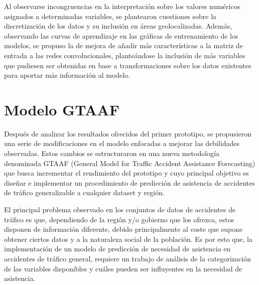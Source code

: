 
Al observarse incongruencias en la interpretación sobre los valores numéricos asignados a determinadas variables, se plantearon cuestiones sobre la discretización de los datos y su inclusión en áreas geolocalizadas. Además, observando las curvas de aprendizaje en las gráficas de entrenamiento de los modelos, se propuso la de mejora de añadir más características a la matriz de entrada a las redes convolucionales, planteándose la inclusión de más variables que pudiesen ser obtenidas en base a transformaciones sobre los datos existentes para aportar más información al modelo.

\section{Modelo GTAAF}
\label{METODOLOGIA_GTAAF}


Después de analizar los resultados ofrecidos del primer prototipo, se propusieron una serie de modificaciones en el modelo enfocadas a mejorar las debilidades observadas. Estos cambios se estructuraron en una nueva metodología denominada GTAAF (General Model for Traffic Accident Assistance Forecasting) que busca incrementar el rendimiento del prototipo y cuyo principal objetivo es diseñar e implementar un procedimiento de predicción de asistencia de accidentes de tráfico generalizable a cualquier dataset y región. 

El principal problema observado en los conjuntos de datos de accidentes de tráfico es que, dependiendo de la región y/o gobierno que los ofrezca, estos disponen de información diferente, debido principalmente al coste que supone obtener ciertos datos y a la naturaleza social de la población. Es por esto que, la implementación de un modelo de predicción de necesidad de asistencia en accidentes de tráfico general, requiere un trabajo de análisis de la categorización de las variables disponibles y cuáles pueden ser influyentes en la necesidad de asistencia.

